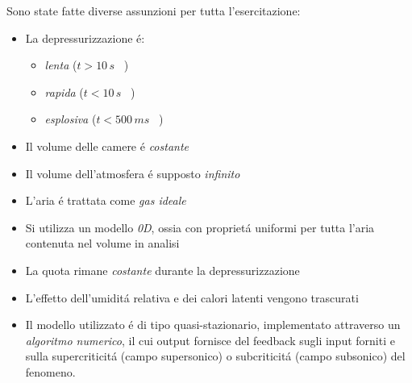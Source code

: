 \documentclass{article}
\begin{document}
    Sono state fatte diverse assunzioni per tutta 
    l'esercitazione:
    \begin{itemize}
        \item La depressurizzazione é:
            \begin{itemize}
                \item \textit{lenta} 
                        ($\displaystyle t > 10\, s$ \ ) 
                \item \textit{rapida} 
                        ($\displaystyle t < 10\, s$ \ )
                \item \textit{esplosiva} 
                        ($\displaystyle t < 500\, ms$ \ )
            \end{itemize}
        \item Il volume delle camere é \textit{costante}
        \item Il volume dell'atmosfera é supposto \textit{infinito}
        \item L'aria é trattata come \textit{gas ideale}
        \item Si utilizza un modello \textit{0D}, ossia con
              proprietá uniformi per tutta l'aria contenuta nel volume in analisi
        \item La quota rimane \textit{costante} durante la depressurizzazione
        \item L'effetto dell'umiditá relativa e dei calori latenti vengono trascurati
        \item Il modello utilizzato é di tipo quasi-stazionario, implementato attraverso un 
              \textit{algoritmo numerico}, il cui output fornisce 
              del feedback sugli input forniti e sulla supercriticitá (campo supersonico) o subcriticitá (campo subsonico)
              del fenomeno.

    \end{itemize}
\end{document}
